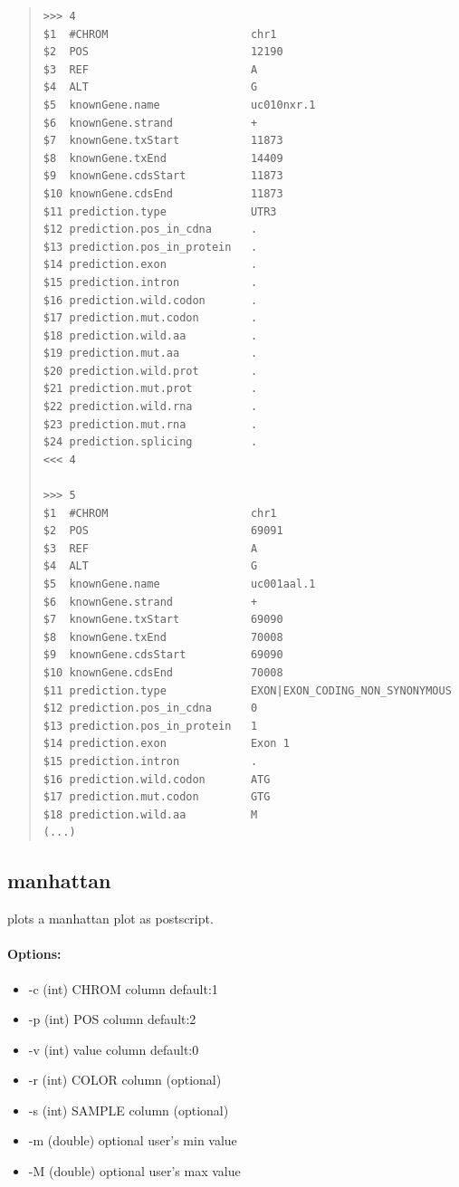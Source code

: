 \documentclass[12pt]{article}
\begin{document}
\begin{quote}
\begin{verbatim}
>>>	4
$1	#CHROM                   	chr1
$2	POS                      	12190
$3	REF                      	A
$4	ALT                      	G
$5	knownGene.name           	uc010nxr.1
$6	knownGene.strand         	+
$7	knownGene.txStart        	11873
$8	knownGene.txEnd          	14409
$9	knownGene.cdsStart       	11873
$10	knownGene.cdsEnd         	11873
$11	prediction.type          	UTR3
$12	prediction.pos_in_cdna   	.
$13	prediction.pos_in_protein	.
$14	prediction.exon          	.
$15	prediction.intron        	.
$16	prediction.wild.codon    	.
$17	prediction.mut.codon     	.
$18	prediction.wild.aa       	.
$19	prediction.mut.aa        	.
$20	prediction.wild.prot     	.
$21	prediction.mut.prot      	.
$22	prediction.wild.rna      	.
$23	prediction.mut.rna       	.
$24	prediction.splicing      	.
<<<	4

>>>	5
$1	#CHROM                   	chr1
$2	POS                      	69091
$3	REF                      	A
$4	ALT                      	G
$5	knownGene.name           	uc001aal.1
$6	knownGene.strand         	+
$7	knownGene.txStart        	69090
$8	knownGene.txEnd          	70008
$9	knownGene.cdsStart       	69090
$10	knownGene.cdsEnd         	70008
$11	prediction.type          	EXON|EXON_CODING_NON_SYNONYMOUS
$12	prediction.pos_in_cdna   	0
$13	prediction.pos_in_protein	1
$14	prediction.exon          	Exon 1
$15	prediction.intron        	.
$16	prediction.wild.codon    	ATG
$17	prediction.mut.codon     	GTG
$18	prediction.wild.aa       	M
(...)
\end{verbatim}
\end{quote}

\subsection{manhattan}
plots a manhattan plot as postscript.
\paragraph{Options:}
\begin{itemize}
\item-c (int) CHROM column default:1
\item-p (int) POS column default:2
\item-v (int) value column default:0
\item-r (int) COLOR column (optional)
\item-s (int) SAMPLE column (optional)
\item-m (double) optional user's min value
\item-M (double) optional user's max value
\end{itemize}
\end{document}
